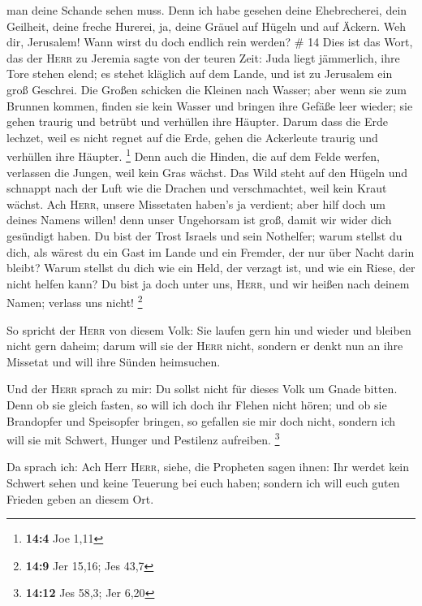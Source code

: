 man deine Schande sehen muss.  Denn ich habe gesehen
deine Ehebrecherei, dein Geilheit, deine freche Hurerei, ja, deine
Gräuel auf Hügeln und auf Äckern. Weh dir, Jerusalem! Wann wirst du doch
endlich rein werden? \# 14  Dies ist das Wort, das der
\textsc{Herr} zu Jeremia sagte von der teuren Zeit:  Juda
liegt jämmerlich, ihre Tore stehen elend; es stehet kläglich auf dem
Lande, und ist zu Jerusalem ein groß Geschrei.  Die Großen
schicken die Kleinen nach Wasser; aber wenn sie zum Brunnen kommen,
finden sie kein Wasser und bringen ihre Gefäße leer wieder; sie gehen
traurig und betrübt und verhüllen ihre Häupter.  Darum
dass die Erde lechzet, weil es nicht regnet auf die Erde, gehen die
Ackerleute traurig und verhüllen ihre Häupter. \footnote{\textbf{14:4}
  Joe 1,11}  Denn auch die Hinden, die auf dem Felde
werfen, verlassen die Jungen, weil kein Gras wächst.  Das
Wild steht auf den Hügeln und schnappt nach der Luft wie die Drachen und
verschmachtet, weil kein Kraut wächst.  Ach \textsc{Herr},
unsere Missetaten haben's ja verdient; aber hilf doch um deines Namens
willen! denn unser Ungehorsam ist groß, damit wir wider dich gesündigt
haben.  Du bist der Trost Israels und sein Nothelfer;
warum stellst du dich, als wärest du ein Gast im Lande und ein Fremder,
der nur über Nacht darin bleibt?  Warum stellst du dich
wie ein Held, der verzagt ist, und wie ein Riese, der nicht helfen kann?
Du bist ja doch unter uns, \textsc{Herr}, und wir heißen nach deinem
Namen; verlass uns nicht! \footnote{\textbf{14:9} Jer 15,16; Jes 43,7}

 So spricht der \textsc{Herr} von diesem Volk: Sie laufen
gern hin und wieder und bleiben nicht gern daheim; darum will sie der
\textsc{Herr} nicht, sondern er denkt nun an ihre Missetat und will ihre
Sünden heimsuchen.

 Und der \textsc{Herr} sprach zu mir: Du sollst nicht für
dieses Volk um Gnade bitten.  Denn ob sie gleich fasten,
so will ich doch ihr Flehen nicht hören; und ob sie Brandopfer und
Speisopfer bringen, so gefallen sie mir doch nicht, sondern ich will sie
mit Schwert, Hunger und Pestilenz aufreiben. \footnote{\textbf{14:12}
  Jes 58,3; Jer 6,20}

 Da sprach ich: Ach Herr \textsc{Herr}, siehe, die
Propheten sagen ihnen: Ihr werdet kein Schwert sehen und keine Teuerung
bei euch haben; sondern ich will euch guten Frieden geben an diesem Ort.

